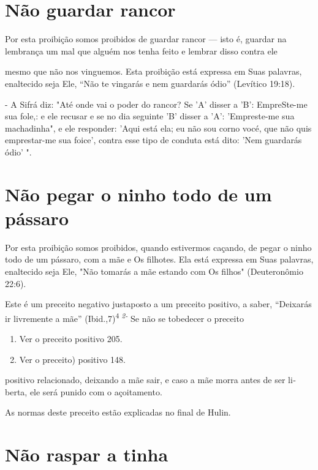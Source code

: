 \section{Não guardar rancor}

Por esta proibição somos proibidos de guardar rancor --- isto é,
guar­dar na lembrança um mal que alguém nos tenha feito e lembrar disso
contra ele

mesmo que não nos vinguemos. Esta proibição está expressa em Suas
pala­vras, enaltecido seja Ele, ``Não te vingarás e nem guardarás ódio''
(Levítico 19:18).

- A Sifrá diz: "Até onde vai o poder do rancor? Se 'A' disser a 'B':
EmpreSte-me sua fole,: e ele recusar e se no dia seguinte 'B' disser a
'A': 'Em­preste-me sua machadinha", e ele responder: 'Aqui está ela; eu
não sou corno vocé, que não quis emprestar-me sua foice', contra esse
tipo de conduta está di­to: 'Nem guardarás ódio' ".

\section{Não pegar o ninho todo de um pássaro}

Por esta proibição somos proibidos, quando estivermos caçando, de pegar
o ninho todo de um pássaro, com a mãe e Os filhotes. Ela está expressa
em Suas palavras, enaltecido seja Ele, "Não tomarás a mãe estando com Os
fi­lhos" (Deuteronômio 22:6).

Este é um preceito negativo justaposto a um preceito positivo, a sa­ber,
``Deixarás ir livremente a mãe'' (Ibid.,7)\textsuperscript{4 \emph{2-}} Se
não se tobedecer o preceito


\begin{enumerate}
\def\labelenumi{\arabic{enumi}.}
\setcounter{enumi}{425}
\item
 
 Ver o preceito positivo 205.
 
\item
 
 Ver o preceito) positivo 148.
 
\end{enumerate}


positivo relacionado, deixando a mãe sair, e caso a mãe morra antes de
ser li­berta, ele será punido com o açoitamento.

As normas deste preceito estão explicadas no final de Hulin.

\section{Não raspar a tinha}

